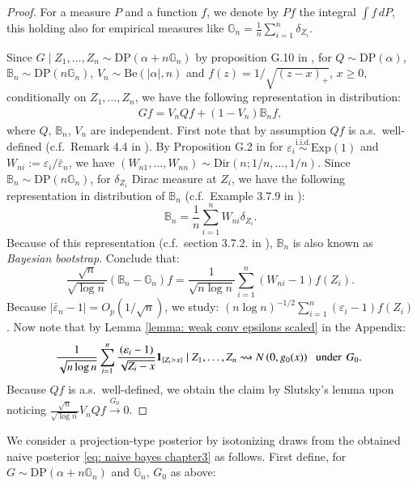 \begin{proof}
	For a measure $P$ and a function $f$, we denote by $Pf$ the integral $\int f \, dP$, this holding also for empirical measures like $\mathbb{G}_n = \frac{1}{n} \sum_{i=1}^n \delta_{Z_i}$. 
	
	Since $G \mid Z_1,\ldots,Z_n \sim \text{DP}(\alpha + n \mathbb{G}_n)$ by proposition G.10 in \cite{4}, for \( Q \sim \text{DP}(\alpha) \), \( \mathbb{B}_n \sim \text{DP}(n \mathbb{G}_n) \), \( V_n \sim \text{Be}(|\alpha|, n) \) and $f(z) = 1/\sqrt{(z-x)_+} $, $x \geq 0 $, conditionally on $Z_1,\ldots,Z_n$, we have the following representation in distribution:
	\begin{align}\label{eq: first representation in distribution}
	G f = V_n Q f + (1 - V_n) \mathbb{B}_n f,
	\end{align}
	where \( Q  \), \( \mathbb{B}_n \), \( V_n  \) are independent. First note that by assumption $Qf$ is a.s.\ well-defined (c.f.\ Remark 4.4 in \cite{4}). By Proposition G.2 in \cite{4} for \( \varepsilon_i \overset{\text{i.i.d.}}{\sim} \text{Exp}(1) \) and \( W_{ni} := \varepsilon_i / \bar{\varepsilon}_n \), we have \( (W_{n1}, \ldots, W_{nn}) \sim \text{Dir}(n; 1/n, \dots, 1/n) \). Since \( \mathbb{B}_n \sim \text{DP}(n \mathbb{G}_n) \), for $\delta_{Z_i}$ Dirac measure at $Z_i$, we have the following representation in distribution of $\mathbb{B}_n$ (c.f.\ Example 3.7.9 in \cite{5}):
	\[
	\mathbb{B}_n = \frac{1}{n} \sum_{i=1}^n W_{ni} \delta_{Z_i}.
	\]
	Because of this representation (c.f.\ section 3.7.2. in \cite{5}), $\mathbb{B}_n$ is also known as \textit{Bayesian bootstrap}. Conclude that: 
	\[
		\frac{\sqrt{n}}{\sqrt{\log n}} (\mathbb{B}_n - \mathbb{G}_n) f = \frac{1}{\sqrt{n \log n}} \sum_{i=1}^n \left( W_{ni} - 1 \right) f(Z_i).
	\]
	 Because $|\bar{\varepsilon}_n - 1| = O_p(1/\sqrt{n})$, we study: $(n \log n)^{-1/2} \sum_{i=1}^n \left( \varepsilon_i - 1 \right) f(Z_i)$. Now note that by Lemma \ref{lemma: weak conv epsilons scaled} in the Appendix:
	\begin{align}\label{eq: weak conv for NBP}
		\frac{1}{\sqrt{n \log{n}}} \sum_{i=1}^n \frac{(\varepsilon_i -1)}{\sqrt{Z_i - x}} \mathbf{1}_{\{ Z_i >x \}} \mid Z_1, \ldots, Z_n \rightsquigarrow N\left(0, g_0(x)\right) \, \, \text { under } \, G_0 \text {. }
	\end{align}
	Because $Qf$ is a.s.\ well-defined, we obtain the claim by Slutsky's lemma upon noticing $ \frac{\sqrt{n}}{\sqrt{\log{n}}} V_n Q f \stackrel{G_0}{\rightarrow} 0$.
\end{proof}
We consider a projection-type posterior by isotonizing draws from the obtained naive posterior \eqref{eq: naive bayes chapter3} as follows. First define, for $G \sim \text{DP}(\alpha + n \mathbb{G}_n)$ and $\mathbb{G}_n$, $G_0$ as above:
